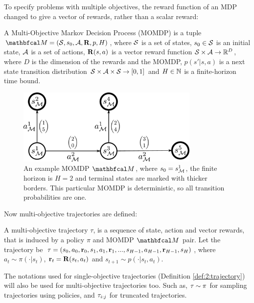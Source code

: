     To specify problems with multiple objectives, the reward function of an MDP changed to give a vector of rewards, rather than a scalar reward:
    \begin{defn}
        \label{def:2:mo_mdp}
        A \textnormal{Multi-Objective Markov Decision Process} (MOMDP) is a tuple $\bfcl{M}=(\cl{S},s_0,\cl{A},\bff{R},p,H)$, where $\mathcal{S}$ is a set of states, $s_0\in\mathcal{S}$ is an initial state, $\mathcal{A}$ is a set of actions, $\mathbf{R}(s,a)$ is a vector reward function $\mathcal{S}\times \mathcal{A}\rightarrow \mathbb{R}^D$, where $D$ is the dimension of the rewards and the MOMDP, $p(s' | s,a)$ is a next state transition distribution $\mathcal{S} \times \mathcal{A} \times \mathcal{S} \rightarrow [0,1]$ and $H\in\mathbb{N}$ is a finite-horizon time bound.
    \end{defn}

    \begin{figure}
        \centering\includegraphics[width=0.8\textwidth]{figures/ch2/example_momdp.pdf} 
        \caption[An example MOMDP $\bfcl{M}$.]{An example MOMDP $\bfcl{M}$, where $s_0=s_{\mathcal{M}}^1$, the finite horizon is $H=2$ and terminal states are marked with thicker borders. This particular MOMDP is deterministic, so all transition probabilities are one.}
        \label{fig:2:momdp_eg}
    \end{figure}

    Now multi-objective trajectories are defined:
    \begin{defn}
        \label{def:2:mo_trajectory}
        A \textnormal{multi-objective trajectory} $\tau$, is a sequence of state, action and vector rewards, that is induced by a policy $\pi$ and MOMDP $\bfcl{M}$ pair. Let the trajectory be $\mathbf{\tau} = (s_0, a_0, \mathbf{r}_0, s_1, a_1, \mathbf{r}_1, ..., s_{H-1}, a_{H-1}, \mathbf{r}_{H-1}, s_H)$, where $a_t \sim \pi(\cdot|s_t)$, $\mathbf{r}_t=\mathbf{R}(s_t,a_t)$ and $s_{t+1} \sim p(\cdot|s_t,a_t)$. 
        
        The notations used for single-objective trajectories (Definition \ref{def:2:trajectory}) will also be used for multi-objective trajectories too. Such as, $\mathbf{\tau}\sim\pi$ for sampling trajectories using policies, and $\mathbf{\tau}_{i:j}$ for truncated trajectories.
    \end{defn}

